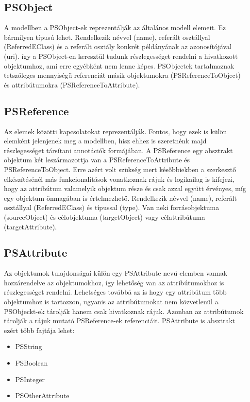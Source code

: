 \subsection{PSObject}
A modellben a PSObject-ek reprezentálják az általános modell elemeit. Ez bármilyen típusú lehet. Rendelkezik névvel (name), referált osztállyal (ReferredEClass) és a referált osztály konkrét példányának az azonosítójával (uri). így a PSObject-en keresztül tudunk részlegességet rendelni a hivatkozott objektumhoz, ami erre egyébként nem lenne képes. PSObjectek tartalmaznak tetszőleges mennyiségű referenciát másik objektumokra (PSReferenceToObject) és attribútumokra (PSReferenceToAttribute).

\subsection{PSReference}
 Az elemek közötti kapcsolatokat reprezentálják. Fontos, hogy ezek is külön elemként jelenjenek meg a modellben, hisz ehhez is szeretnénk majd részlegességet társítani annotációk formájában. A PSReference egy absztrakt objektum két leszármazottja van a  PSReferenceToAttribute és PSReferenceToObject. Erre azért volt szükség mert későbbiekben a szerkesztő elkészítésénél más funkcionalitások vonatkoznak rájuk és logikailag is kifejezi, hogy az attribútum valamelyik objektum része és csak azzal együtt érvényes, míg egy objektum önmagában is értelmezhető. Rendelkezik névvel (name), referált osztállyal (ReferredEClass) és típussal (type). Van neki forrásobjektuma (sourceObject) és célobjektuma (targetObject) vagy célattribútuma (targetAttribute).

\subsection{PSAttribute}
Az objektumok tulajdonságai külön egy PSAttribute nevű elemben vannak hozzárendelve az objektumokhoz, így lehetőség van az attribútumokhoz is részlegességet rendelni. Lehetséges továbbá az is hogy egy attribútum több objektumhoz is tartozzon, ugyanis az attribútumokat nem közvetlenül a PSObjeckt-ek tárolják hanem csak hivatkoznak rájuk. Azonban az attribútumok tárolják a rájuk mutató PSReference-ek referenciáit. PSAttribute is absztrakt ezért több fajtája lehet:

\begin{itemize}  
	\item PSString
	\item PSBoolean
	\item PSInteger
	\item PSOtherAttribute 
\end{itemize}


